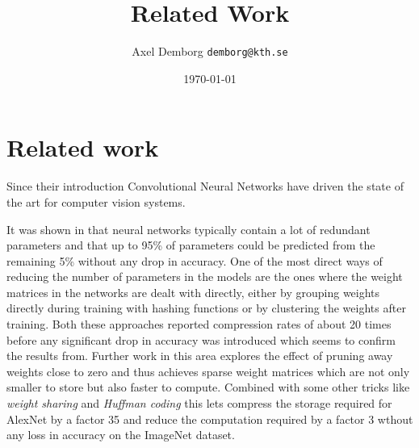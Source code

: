 \documentclass[11pt]{article}
\author{Axel Demborg \texttt{demborg@kth.se}}
\date{\today}
\title{Related Work}
\newcommand{\bibentry}[1]{\cite{#1}}
\begin{document}
\maketitle

\section*{Related work}
\label{sec:org15d91b4}
Since their introduction Convolutional Neural Networks\bibentry{lecun1998gradient} have driven the state of the art for computer vision systems. 

It was shown in\bibentry{denil2013predicting} that neural networks typically contain a lot of redundant parameters and that up to 95\% of parameters could be predicted from the remaining 5\% without any drop in accuracy. One of the most direct ways of reducing the number of parameters in the models are the ones where the weight matrices in the networks are dealt with directly, either by grouping weights directly during training with hashing functions \bibentry{chen2015compressing} or by clustering the weights after training\bibentry{gong2014compressing}. Both these approaches reported compression rates of about 20 times before any significant drop in accuracy was introduced which seems to confirm the results from\bibentry{denil2013predicting}. Further work in this area \bibentry{han2015learning} explores the effect of pruning away weights close to zero and thus achieves sparse weight matrices which are not only smaller to store but also faster to compute. Combined with some other tricks like \emph{weight sharing} and \emph{Huffman coding} this lets\bibentry{han2015deep} compress the storage required for AlexNet by a factor 35 and reduce the computation required by a factor 3 wthout any loss in accuracy on the ImageNet dataset.
\end{document}

